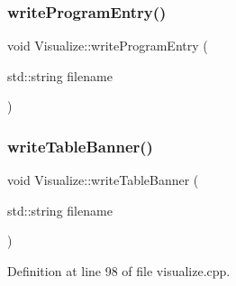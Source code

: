 \mbox{\label{class_visualize_a6e27b451c2662681cb3119e9ff1c22da}} 
\subsubsection{\texorpdfstring{write\+Program\+Entry()}{writeProgramEntry()}}
{\footnotesize\ttfamily void Visualize\+::write\+Program\+Entry (\begin{DoxyParamCaption}\item[{std\+::string}]{filename }\end{DoxyParamCaption})}

\mbox{\label{class_visualize_a14c9e9721eeaca0afde25da0138b43b8}} 
\subsubsection{\texorpdfstring{write\+Table\+Banner()}{writeTableBanner()}}
{\footnotesize\ttfamily void Visualize\+::write\+Table\+Banner (\begin{DoxyParamCaption}\item[{std\+::string}]{filename }\end{DoxyParamCaption})}



Definition at line 98 of file visualize.\+cpp.


